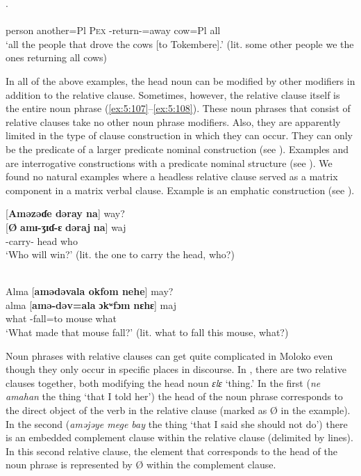 .\\
 \gll [mɪʒɛ ɛnɛŋ=ahaj  \textbf{lɪmɛ} \textbf{amɪ{}-ŋgɛl-ɛ}\textbf{=alaj} \textbf{ɬa}\textbf{=ahaj} \textbf{dʒijga} \textbf{na}]\\
      person  another=Pl  \textsc{Pex}  {\DEP}-return-{\CL}=away  cow=Pl  all  {\PSP}\\
\glt  ‘all the people that drove the cows [to Tokembere].’ (lit. some other people we the ones returning all cows) 
\z

In all of the above examples, the head noun can be modified by other modifiers in addition to the relative clause. Sometimes, however, the relative clause itself is the entire noun phrase (\ref{ex:5:107}--\ref{ex:5:108}). These noun phrases that consist of relative clauses take no other noun phrase modifiers. Also, they are apparently limited in the type of clause construction in which they can occur. They can only be the predicate of a larger predicate nominal construction (see ). Examples  and  are interrogative constructions with a predicate nominal structure (see ). We found no natural examples where a headless relative clause served as a matrix component in a matrix verbal clause. Example  is an emphatic construction (see ). 

\ea \label{ex:5:107}
{}[\textbf{Aməzəɗe  dəray  na}]  way?\\
\gll  {}[\textbf{Ø}    \textbf{amɪ-ʒɪɗ{}-ɛ}    \textbf{dəraj}  \textbf{na}]  waj\\
      { } {\DEP}-carry-{\CL}    head  {\PSP}  who\\
\glt  ‘Who will win?’ (lit. the one to carry the head, who?) 
\z


\ea \label{ex:5:108}\\\relax
 {}Alma  [\textbf{amədəvala  okfom  nehe}]  may?\\
\gll  {}alma [\textbf{amə-dəv=ala} \textbf{ɔkʷfɔm} \textbf{nɛhɛ}]  maj\\
      {what } {\DEP}-fall=to     mouse    {\DEM}    what\\
\glt  ‘What made that mouse fall?’ (lit. what to fall this mouse, what?)
\z

Noun phrases with relative clauses can get quite complicated in Moloko even though they only occur in specific places in discourse. In , there are two relative clauses together, both modifying the head noun \textit{ɛlɛ} ‘thing.’ In the first (\textit{ne amahan}  the thing ‘that I told her’) the head of the noun phrase corresponds to the direct object of the verb in the relative clause (marked as Ø in the example). In the second (\textit{aməjəye mege bay} the thing ‘that I said she should not do’) there is an embedded complement clause within the relative clause (delimited by lines). In this second relative clause, the element that corresponds to the head of the noun phrase is represented by Ø within the complement clause.


